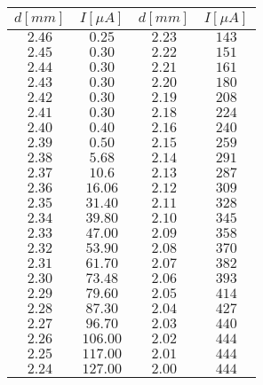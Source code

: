 \begin{tabular}{c|c||c|c}
\(d [mm] \) & \(I [\mu A] \) & \(d [mm] \) & \(I [\mu A] \)\\ 
\hline
\(2.46\) & \(0.25\) & \(2.23\) & \(143\) \\ 
\(2.45\) & \(0.30\) & \(2.22\) & \(151\) \\ 
\(2.44\) & \(0.30\) & \(2.21\) & \(161\) \\ 
\(2.43\) & \(0.30\) & \(2.20\) & \(180\) \\ 
\(2.42\) & \(0.30\) & \(2.19\) & \(208\) \\ 
\(2.41\) & \(0.30\) & \(2.18\) & \(224\) \\ 
\(2.40\) & \(0.40\) & \(2.16\) & \(240\) \\ 
\(2.39\) & \(0.50\) & \(2.15\) & \(259\) \\ 
\(2.38\) & \(5.68\) & \(2.14\) & \(291\) \\ 
\(2.37\) & \(10.6\) & \(2.13\) & \(287\) \\ 
\(2.36\) & \(16.06\) & \(2.12\) & \(309\) \\ 
\(2.35\) & \(31.40\) & \(2.11\) & \(328\) \\ 
\(2.34\) & \(39.80\) & \(2.10\) & \(345\) \\ 
\(2.33\) & \(47.00\) & \(2.09\) & \(358\) \\ 
\(2.32\) & \(53.90\) & \(2.08\) & \(370\) \\ 
\(2.31\) & \(61.70\) & \(2.07\) & \(382\) \\ 
\(2.30\) & \(73.48\) & \(2.06\) & \(393\) \\ 
\(2.29\) & \(79.60\) & \(2.05\) & \(414\) \\ 
\(2.28\) & \(87.30\) & \(2.04\) & \(427\) \\ 
\(2.27\) & \(96.70\) & \(2.03\) & \(440\) \\ 
\(2.26\) & \(106.00\) & \(2.02\) & \(444\) \\ 
\(2.25\) & \(117.00\) & \(2.01\) & \(444\) \\ 
\(2.24\) & \(127.00\) & \(2.00\) & \(444\) \\ 
\end{tabular}
